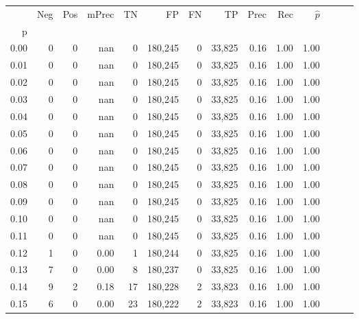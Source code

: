 \begin{tabular}{rrrrrrrrrrrrrr}
\toprule
{} &    Neg &    Pos & mPrec &       TN &       FP &      FN &      TP &  Prec &   Rec & $\hat{p}$ \\
p    &        &        &       &          &          &         &         &       &       &           \\
\midrule
0.00 &      0 &      0 &   nan &        0 &  180,245 &       0 &  33,825 &  0.16 &  1.00 &      1.00 \\
0.01 &      0 &      0 &   nan &        0 &  180,245 &       0 &  33,825 &  0.16 &  1.00 &      1.00 \\
0.02 &      0 &      0 &   nan &        0 &  180,245 &       0 &  33,825 &  0.16 &  1.00 &      1.00 \\
0.03 &      0 &      0 &   nan &        0 &  180,245 &       0 &  33,825 &  0.16 &  1.00 &      1.00 \\
0.04 &      0 &      0 &   nan &        0 &  180,245 &       0 &  33,825 &  0.16 &  1.00 &      1.00 \\
0.05 &      0 &      0 &   nan &        0 &  180,245 &       0 &  33,825 &  0.16 &  1.00 &      1.00 \\
0.06 &      0 &      0 &   nan &        0 &  180,245 &       0 &  33,825 &  0.16 &  1.00 &      1.00 \\
0.07 &      0 &      0 &   nan &        0 &  180,245 &       0 &  33,825 &  0.16 &  1.00 &      1.00 \\
0.08 &      0 &      0 &   nan &        0 &  180,245 &       0 &  33,825 &  0.16 &  1.00 &      1.00 \\
0.09 &      0 &      0 &   nan &        0 &  180,245 &       0 &  33,825 &  0.16 &  1.00 &      1.00 \\
0.10 &      0 &      0 &   nan &        0 &  180,245 &       0 &  33,825 &  0.16 &  1.00 &      1.00 \\
0.11 &      0 &      0 &   nan &        0 &  180,245 &       0 &  33,825 &  0.16 &  1.00 &      1.00 \\
0.12 &      1 &      0 &  0.00 &        1 &  180,244 &       0 &  33,825 &  0.16 &  1.00 &      1.00 \\
0.13 &      7 &      0 &  0.00 &        8 &  180,237 &       0 &  33,825 &  0.16 &  1.00 &      1.00 \\
0.14 &      9 &      2 &  0.18 &       17 &  180,228 &       2 &  33,823 &  0.16 &  1.00 &      1.00 \\
0.15 &      6 &      0 &  0.00 &       23 &  180,222 &       2 &  33,823 &  0.16 &  1.00 &      1.00 \\

\end{tabular}
